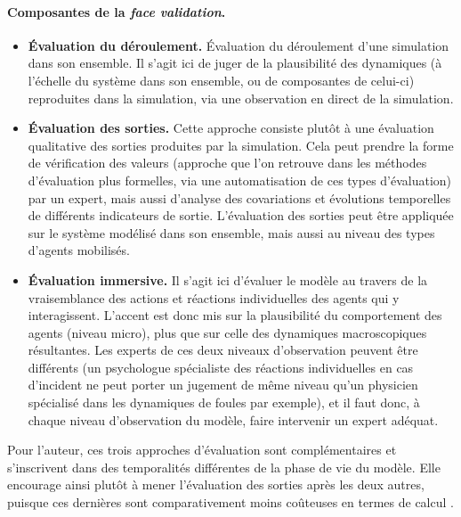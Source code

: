 \paragraph{Composantes de la \textit{face validation}.}\label{par:composantes-face-validation}
\begin{itemize}
	\item \textbf{Évaluation du déroulement.} Évaluation du déroulement d'une simulation dans son ensemble.
	Il s'agit ici de juger de la plausibilité des dynamiques (à l'échelle du système dans son ensemble, ou de composantes de celui-ci) reproduites dans la simulation, via une observation en direct de la simulation.
	
	\item \textbf{Évaluation des sorties.} Cette approche consiste plutôt à une évaluation qualitative des sorties produites par la simulation.
	Cela peut prendre la forme de vérification des valeurs (approche que l'on retrouve dans les méthodes d'évaluation plus formelles, via une automatisation de ces types d'évaluation) par un expert, mais aussi d'analyse des covariations et évolutions temporelles de différents indicateurs de sortie.
	L'évaluation des sorties peut être appliquée sur le système modélisé dans son ensemble, mais aussi au niveau des types d'agents mobilisés.
	
	\item \textbf{Évaluation \og immersive\fg{}.} Il s'agit ici d'évaluer le modèle au travers de la vraisemblance des actions et réactions individuelles des agents qui y interagissent.
	L'accent est donc mis sur la plausibilité du comportement des agents (niveau micro), plus que sur celle des dynamiques macroscopiques résultantes.
	Les experts de ces deux niveaux d'observation peuvent être différents (un psychologue spécialiste des réactions individuelles en cas d'incident ne peut porter un jugement de même niveau qu'un physicien spécialisé dans les dynamiques de foules par exemple), et il faut donc, à chaque niveau d'observation du modèle, faire intervenir un expert adéquat.
\end{itemize}


Pour l'auteur, ces trois approches d'évaluation sont complémentaires et s'inscrivent dans des temporalités différentes de la phase de vie du modèle.
Elle encourage ainsi plutôt à mener l'évaluation des sorties après les deux autres, puisque ces dernières sont comparativement moins coûteuses en termes de calcul \autocite[42]{klugl_validation_2008}.

